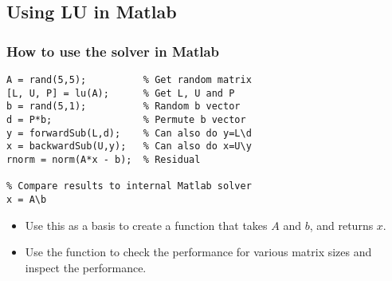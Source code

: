 
\subsection*{Using LU in Matlab}
\begin{frame}[fragile]
  \frametitle{How to use the solver in Matlab}
  \begin{lstlisting}
A = rand(5,5);          % Get random matrix
[L, U, P] = lu(A);      % Get L, U and P
b = rand(5,1);          % Random b vector
d = P*b;                % Permute b vector
y = forwardSub(L,d);    % Can also do y=L\d
x = backwardSub(U,y);   % Can also do x=U\y
rnorm = norm(A*x - b);  % Residual

% Compare results to internal Matlab solver
x = A\b
  \end{lstlisting}
  \pause
  \begin{itemize}
     \item Use this as a basis to create a function that takes $A$ and $b$, and returns $x$.
     \item Use the function to check the performance for various matrix sizes and inspect the performance.
  \end{itemize}

\end{frame}
